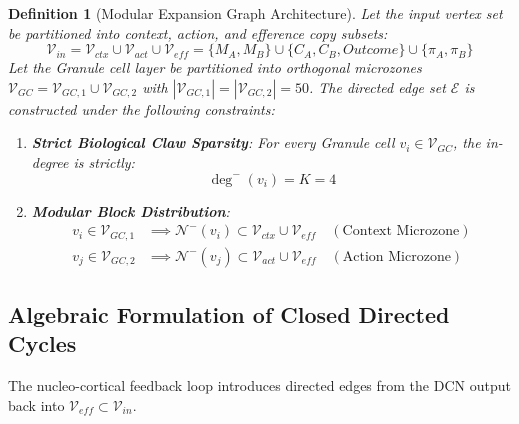 \documentclass[11pt,a4paper]{article}
\newtheorem{definition}{Definition}
\begin{document}
\begin{definition}[Modular Expansion Graph Architecture]
Let the input vertex set be partitioned into context, action, and efference copy subsets:
\begin{equation}
\mathcal{V}_{in} = \mathcal{V}_{ctx} \cup \mathcal{V}_{act} \cup \mathcal{V}_{eff} = \{M_A, M_B\} \cup \{C_A, C_B, Outcome\} \cup \{\pi_A, \pi_B\}
\end{equation}
Let the Granule cell layer be partitioned into orthogonal microzones $\mathcal{V}_{GC} = \mathcal{V}_{GC, 1} \cup \mathcal{V}_{GC, 2}$ with $|\mathcal{V}_{GC, 1}| = |\mathcal{V}_{GC, 2}| = 50$. The directed edge set $\mathcal{E}$ is constructed under the following constraints:
\begin{enumerate}
    \item \textbf{Strict Biological Claw Sparsity}: For every Granule cell $v_i \in \mathcal{V}_{GC}$, the in-degree is strictly:
    \begin{equation}
    \deg^-(v_i) = K = 4
    \end{equation}
    \item \textbf{Modular Block Distribution}:
    \begin{align}
    v_i \in \mathcal{V}_{GC, 1} &\implies \mathcal{N}^-(v_i) \subset \mathcal{V}_{ctx} \cup \mathcal{V}_{eff} \quad (\text{Context Microzone}) \\
    v_j \in \mathcal{V}_{GC, 2} &\implies \mathcal{N}^-(v_j) \subset \mathcal{V}_{act} \cup \mathcal{V}_{eff} \quad (\text{Action Microzone})
    \end{align}
\end{enumerate}
\end{definition}

\subsection{Algebraic Formulation of Closed Directed Cycles}
The nucleo-cortical feedback loop introduces directed edges from the DCN output back into $\mathcal{V}_{eff} \subset \mathcal{V}_{in}$.
\end{document}
